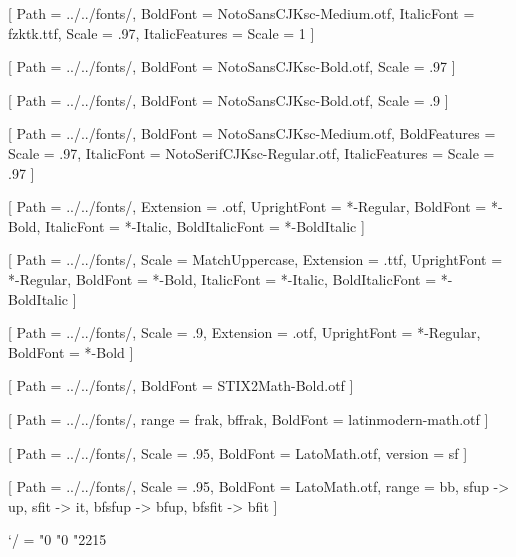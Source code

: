 \usepackage{geometry}
\geometry{
    paperwidth = 155mm,
    paperheight = 235mm,
    outer = 20mm,
    inner = 20mm,
    top = 25mm,
    bottom = 20mm
}

\usepackage[PunctStyle=kaiming]{xeCJK}
\usepackage{amsmath}
\usepackage{unicode-math}

[
    Path = ../../fonts/,
    BoldFont = NotoSansCJKsc-Medium.otf,
    ItalicFont = fzktk.ttf,
    Scale = .97,
    ItalicFeatures = {Scale = 1}
]

[
    Path = ../../fonts/,
    BoldFont = NotoSansCJKsc-Bold.otf,
    Scale = .97
]

[
    Path = ../../fonts/,
    BoldFont = NotoSansCJKsc-Bold.otf,
    Scale = .9
]

[
    Path = ../../fonts/,
    BoldFont = NotoSansCJKsc-Medium.otf,
    BoldFeatures = {Scale = .97},
    ItalicFont = NotoSerifCJKsc-Regular.otf,
    ItalicFeatures = {Scale = .97}
]

\setmainfont{STIX2Text}[
    Path = ../../fonts/,
    Extension = .otf,
    UprightFont = *-Regular,
    BoldFont = *-Bold,
    ItalicFont = *-Italic,
    BoldItalicFont = *-BoldItalic
]

\setsansfont{Lato}[
    Path = ../../fonts/,
    Scale = MatchUppercase,
    Extension = .ttf,
    UprightFont = *-Regular,
    BoldFont = *-Bold,
    ItalicFont = *-Italic,
    BoldItalicFont = *-BoldItalic
]

\setmonofont{FiraMono}[
    Path = ../../fonts/,
    Scale = .9,
    Extension = .otf,
    UprightFont = *-Regular,
    BoldFont = *-Bold
]

[
    Path = ../../fonts/,
    BoldFont = STIX2Math-Bold.otf
]

[
    Path = ../../fonts/,
    range = {frak, bffrak},
    BoldFont = latinmodern-math.otf
]

[
    Path = ../../fonts/,
    Scale = .95,
    BoldFont = LatoMath.otf,
    version = sf
]

[
    Path = ../../fonts/,
    Scale = .95,
    BoldFont = LatoMath.otf,
    range = {bb, sfup -> up, sfit -> it, bfsfup -> bfup, bfsfit -> bfit}
]

\Umathcode`/  =  "0 "0 "2215    %

